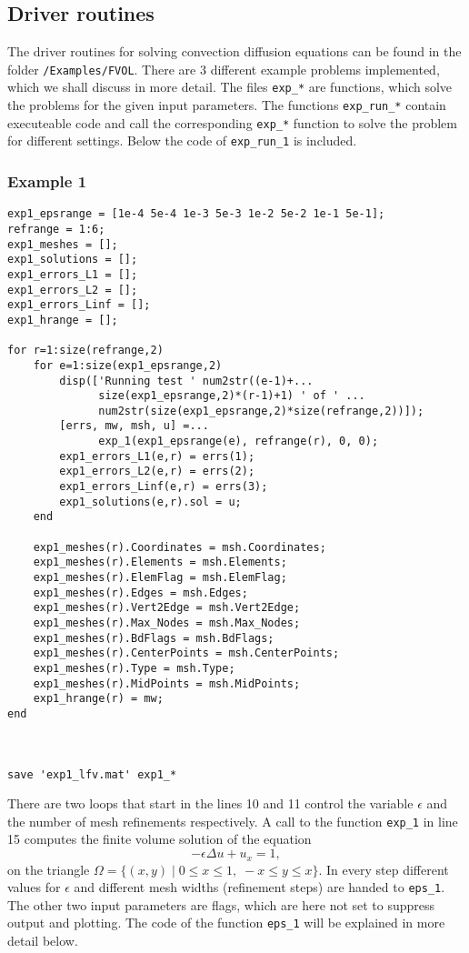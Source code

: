 \subsection{Driver routines}

The driver routines for solving convection diffusion equations can be found in the folder \texttt{/Examples/FVOL}. There are $3$ different example problems implemented, which we shall discuss in more detail. The files \texttt{exp\_*} are functions, which solve the problems for the given input parameters. The functions \texttt{exp\_run\_*} contain executeable code and call the corresponding \texttt{exp\_*} function to solve the problem for different settings. Below the code of \texttt{exp\_run\_1} is included.

\subsubsection{Example 1}

\begin{lstlisting}
exp1_epsrange = [1e-4 5e-4 1e-3 5e-3 1e-2 5e-2 1e-1 5e-1];
refrange = 1:6;
exp1_meshes = [];
exp1_solutions = [];
exp1_errors_L1 = [];
exp1_errors_L2 = [];
exp1_errors_Linf = [];
exp1_hrange = [];

for r=1:size(refrange,2)
    for e=1:size(exp1_epsrange,2)
        disp(['Running test ' num2str((e-1)+...
              size(exp1_epsrange,2)*(r-1)+1) ' of ' ...
              num2str(size(exp1_epsrange,2)*size(refrange,2))]);
        [errs, mw, msh, u] =...
              exp_1(exp1_epsrange(e), refrange(r), 0, 0);
        exp1_errors_L1(e,r) = errs(1);
        exp1_errors_L2(e,r) = errs(2);
        exp1_errors_Linf(e,r) = errs(3);
        exp1_solutions(e,r).sol = u;
    end

    exp1_meshes(r).Coordinates = msh.Coordinates;
    exp1_meshes(r).Elements = msh.Elements;
    exp1_meshes(r).ElemFlag = msh.ElemFlag;
    exp1_meshes(r).Edges = msh.Edges;
    exp1_meshes(r).Vert2Edge = msh.Vert2Edge;
    exp1_meshes(r).Max_Nodes = msh.Max_Nodes;
    exp1_meshes(r).BdFlags = msh.BdFlags;
    exp1_meshes(r).CenterPoints = msh.CenterPoints;
    exp1_meshes(r).Type = msh.Type;
    exp1_meshes(r).MidPoints = msh.MidPoints;
    exp1_hrange(r) = mw;
end

    

save 'exp1_lfv.mat' exp1_*
\end{lstlisting}

There are two loops that start in the lines 10 and 11 control the variable $\epsilon$ and the number of mesh refinements respectively. A call to the function \texttt{exp\_1} in line 15 computes the finite volume solution of the equation
\begin{equation}
 -\epsilon\Delta u + u_x = 1,
\end{equation}
on the triangle $\Omega = \{(x,y)\;|\;0\leq x\leq1,\;-x\leq y\leq x\}$. In every step different values for $\epsilon$ and different mesh widths (refinement steps) are handed to \texttt{eps\_1}. The other two input parameters are flags, which are here not set to suppress output and plotting. The code of the function \texttt{eps\_1} will be explained in more detail below.

